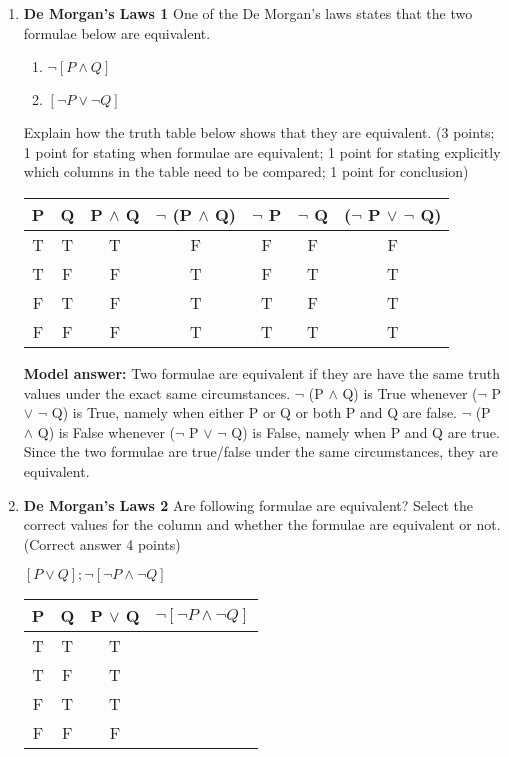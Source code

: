 \documentclass[a4,11pt]{article}
\newcommand{\6}{\mbox{$[\hspace*{-.6mm}[$}}
\newcommand{\9}{\mbox{$]\hspace*{-.6mm}]$}}
\begin{document}
\begin{enumerate}[leftmargin = 12pt]
{ \bf Model answer:}  The correct answer is (b), the argument is not valid. It is not valid because there is one case in which the premises are true (R is true and P $\to$ R is true) but the conclusion is false.


\item {\bf De Morgan's Laws 1} One of the De Morgan's laws states that the two formulae below are equivalent. 

\begin{enumerate}
\item  $\neg [ P \land  Q ]$
\item  $ [ \neg P \lor \neg Q ]$
\end{enumerate}

Explain how the truth table below shows that they are equivalent. (3 points; 1 point for stating when formulae are equivalent; 1 point for stating explicitly which columns in the table need to be compared; 1 point for conclusion)

\begin{tabular}{c | c | c | c | c | c | c}
\hline \hline
P & Q & P $\land$ Q & $\neg$ (P $\land$ Q) & $\neg$ P & $\neg$ Q & ($\neg$ P $\lor$ $\neg$ Q) \\
\hline \hline
T & T & T  & F & F & F & F\\
T & F & F & T & F & T & T\\
F & T & F& T & T & F & T\\
F & F & F& T& T & T & T\\
\hline \hline


\end{tabular}

{ \bf Model answer:} Two formulae are equivalent if they are have the same truth values under the exact same circumstances. $\neg$ (P $\land$ Q) is True whenever ($\neg$ P $\lor$ $\neg$ Q) is True, namely when either P or Q or both P and Q are false. $\neg$ (P $\land$ Q) is False whenever  ($\neg$ P $\lor$ $\neg$ Q) is False, namely when P and Q are true. Since the two formulae are true/false under the same circumstances, they are equivalent.




\item {\bf De Morgan's Laws 2} Are following formulae are equivalent? Select the correct values for the column and whether the formulae are equivalent or not. (Correct answer 4 points)

 $[P \lor Q]; \neg [ \neg P \land \neg Q]$


\begin{tabular}{c | c | c | c }
\hline \hline
P & Q & P $\lor$ Q & $\neg [ \neg P \land \neg Q]$ \\
\hline \hline
T & T & T \\
T & F & T \\
F & T & T \\
F & F & F \\
\hline \hline
\end{tabular}


\end{enumerate}
\end{document}
